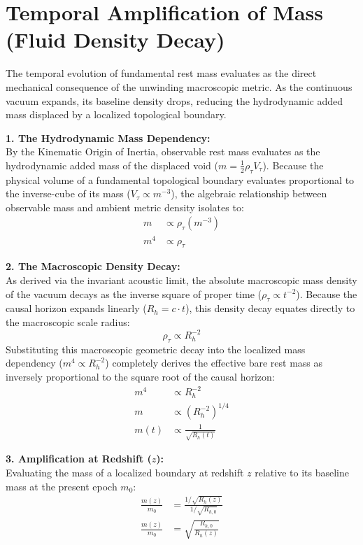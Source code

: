 \documentclass[11pt, a4paper]{article}
\begin{document}
\section{Temporal Amplification of Mass (Fluid Density Decay)}
\label{sec:deriv_mass_amplification}

The temporal evolution of fundamental rest mass evaluates as the direct mechanical consequence of the unwinding macroscopic metric. As the continuous vacuum expands, its baseline density drops, reducing the hydrodynamic added mass displaced by a localized topological boundary.

\textbf{1. The Hydrodynamic Mass Dependency:} \\
By the Kinematic Origin of Inertia, observable rest mass evaluates as the hydrodynamic added mass of the displaced void ($m = \frac{1}{2}\rho_{\tau} V_{\tau}$). Because the physical volume of a fundamental topological boundary evaluates proportional to the inverse-cube of its mass ($V_{\tau} \propto m^{-3}$), the algebraic relationship between observable mass and ambient metric density isolates to:
\begin{align}
    m &\propto \rho_{\tau} (m^{-3}) \nonumber \\
    m^4 &\propto \rho_{\tau} 
\end{align}

\textbf{2. The Macroscopic Density Decay:} \\
As derived via the invariant acoustic limit, the absolute macroscopic mass density of the vacuum decays as the inverse square of proper time ($\rho_{\tau} \propto t^{-2}$). Because the causal horizon expands linearly ($R_h = c \cdot t$), this density decay equates directly to the macroscopic scale radius:
\begin{equation}
    \rho_{\tau} \propto R_h^{-2} 
\end{equation}
Substituting this macroscopic geometric decay into the localized mass dependency ($m^4 \propto R_h^{-2}$) completely derives the effective bare rest mass as inversely proportional to the square root of the causal horizon:
\begin{align}
    m^4 &\propto R_h^{-2} \nonumber \\
    m &\propto \left(R_h^{-2}\right)^{1/4} \nonumber \\
    m(t) &\propto \frac{1}{\sqrt{R_h(t)}} 
\end{align}

\textbf{3. Amplification at Redshift ($z$):} \\
Evaluating the mass of a localized boundary at redshift $z$ relative to its baseline mass at the present epoch $m_0$:
\begin{align}
    \frac{m(z)}{m_0} &= \frac{1/\sqrt{R_h(z)}}{1/\sqrt{R_{h,0}}} \\
    \frac{m(z)}{m_0} &= \sqrt{ \frac{R_{h,0}}{R_h(z)} }
\end{align}
\end{document}
